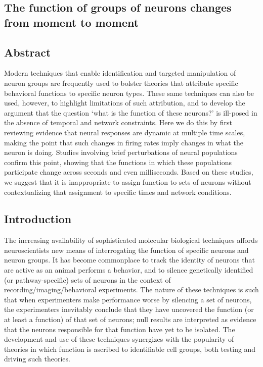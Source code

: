 \begin{refsection}

\chapter[Dynamic Function of Neurons]{The function of groups of neurons changes from moment to moment}

\section{Abstract}
Modern techniques that enable identification and targeted manipulation of neuron groups are frequently used to bolster theories that attribute specific behavioral functions to specific neuron types. These same techniques can also be used, however, to highlight limitations of such attribution, and to develop the argument that the question ‘what is the function of these neurons?’ is ill-posed in the absence of temporal and network constraints. Here we do this by first reviewing evidence that neural responses are dynamic at multiple time scales, making the point that such changes in firing rates imply changes in what the neuron is doing. Studies involving brief perturbations of neural populations confirm this point, showing that the functions in which these populations participate change across seconds and even milliseconds. Based on these studies, we suggest that it is inappropriate to assign function to sets of neurons without contextualizing that assignment to specific times and network conditions.

\section{Introduction}
The increasing availability of sophisticated molecular biological techniques affords neuroscientists new means of interrogating the function of specific neurons and neuron groups. It has become commonplace to track the identity of neurons that are active as an animal performs a behavior, and to silence genetically identified (or pathway-specific) sets of neurons in the context of recording/imaging/behavioral experiments. The nature of these techniques is such that when experimenters make performance worse by silencing a set of neurons, the experimenters inevitably conclude that they have uncovered the function (or at least a function) of that set of neurons; null results are interpreted as evidence that the neurons responsible for that function have yet to be isolated. The development and use of these techniques synergizes with the popularity of theories in which function is ascribed to identifiable cell groups, both testing and driving such theories.


\end{refsection}
